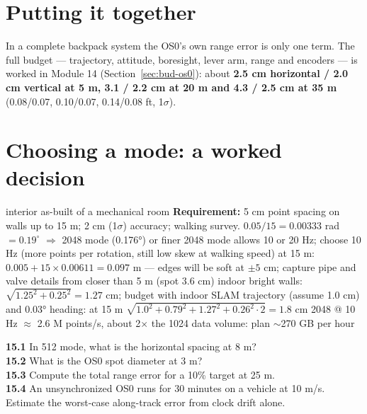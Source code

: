 \section{Putting it together}
In a complete backpack system the OS0's own range error is only one term. The full budget --- trajectory, attitude, boresight, lever arm, range and encoders --- is worked in Module 14 (Section~\ref{sec:bud-os0}): about \textbf{2.5 cm horizontal / 2.0 cm vertical at 5 m, 3.1 / 2.2 cm at 20 m and 4.3 / 2.5 cm at 35 m} (0.08/0.07, 0.10/0.07, 0.14/0.08 ft, 1$\sigma$).

\section{Choosing a mode: a worked decision}
\begin{worked}{interior as-built of a mechanical room}
\textbf{Requirement:} 5 cm point spacing on walls up to 15 m; 2 cm (1$\sigma$) accuracy; walking survey.
 $0.05/15=0.00333$ rad $=0.19^\circ$ $\Rightarrow$ 2048 mode (0.176°) or finer
 2048 mode allows 10 or 20 Hz; choose 10 Hz (more points per rotation, still low skew at walking speed)
 at 15 m: $0.005+15\times0.00611=0.097$ m --- edges will be soft at $\pm5$ cm; capture pipe and valve details from closer than 5 m (spot 3.6 cm)
 indoor bright walls: $\sqrt{1.25^2+0.25^2}=1.27$ cm; budget with indoor SLAM trajectory (assume 1.0 cm) and 0.03° heading: at 15 m $\sqrt{1.0^2+0.79^2+1.27^2+0.26^2\cdot2}=1.8$ cm \checkmark
{} 2048 @ 10 Hz $\approx$ 2.6 M points/s, about 2$\times$ the 1024 data volume: plan $\sim$270 GB per hour
\end{worked}

\begin{tryit}
\textbf{15.1} In 512 mode, what is the horizontal spacing at 8 m?\\
\textbf{15.2} What is the OS0 spot diameter at 3 m?\\
\textbf{15.3} Compute the total range error for a 10\% target at 25 m.\\
\textbf{15.4} An unsynchronized OS0 runs for 30 minutes on a vehicle at 10 m/s. Estimate the worst-case along-track error from clock drift alone.
\end{tryit}

